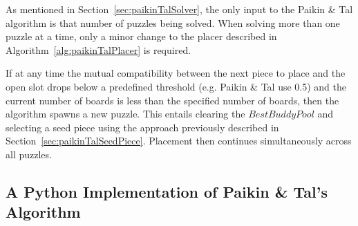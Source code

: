 \documentclass{report}
\begin{document}
As mentioned in Section~\ref{sec:paikinTalSolver}, the only input to the Paikin \& Tal algorithm is that number of puzzles being solved.   When solving more than one puzzle at a time, only a minor change to the placer described in Algorithm~\ref{alg:paikinTalPlacer} is required.

If at any time the mutual compatibility between the next piece to place and the open slot drops below a predefined threshold (e.g. Paikin \& Tal use 0.5) and the current number of boards is less than the specified number of boards, then the algorithm spawns a new puzzle.  This entails clearing the $BestBuddyPool$ and selecting a seed piece using the approach previously described in Section~\ref{sec:paikinTalSeedPiece}.   Placement then continues simultaneously across all puzzles.


\subsection{A Python Implementation of Paikin \& Tal's Algorithm}\label{sec:pythonPaikinTalAlgorithm}
















\pagebreak


\end{document}
